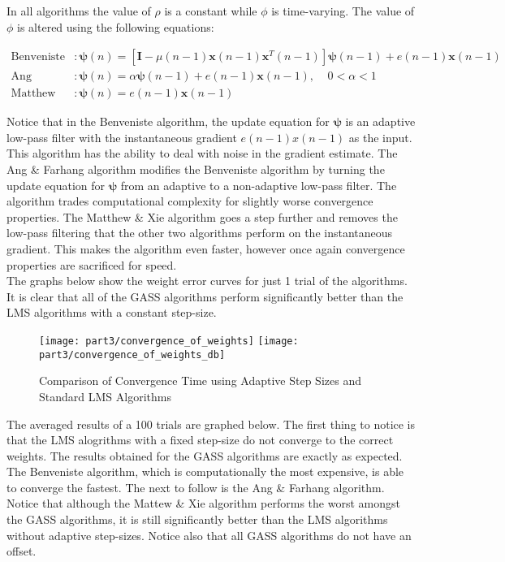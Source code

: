 \noindent{}In all algorithms the value of $\rho$ is a constant while $\phi$ is time-varying. The value of $\phi$ is altered using the following equations:

\begin{align*}
\text{Benveniste}&: \bm{\psi}(n)=[\textbf{I}-\mu(n-1)\textbf{x}(n-1)\textbf{x}^T(n-1)]\bm{\psi}(n-1) + e(n-1)\bm{x}(n-1) \\
\text{Ang \& Farhang}&: \bm{\psi}(n)=\alpha\bm{\psi}(n-1) + e(n-1)\bm{x}(n-1), \ \ \ \ \ 0 < \alpha < 1 \\
\text{Matthew \& Xie}&: \bm{\psi}(n)=e(n-1)\bm{x}(n-1)
\end{align*}

\noindent{}Notice that in the Benveniste algorithm, the update equation for $\bm{\psi}$ is an adaptive low-pass filter with the instantaneous gradient $e(n-1)x(n-1)$ as the input. This algorithm has the ability to deal with noise in the gradient estimate. The Ang \& Farhang algorithm modifies the Benveniste algorithm by turning the update equation for $\bm{\psi}$ from an adaptive to a non-adaptive low-pass filter. The algorithm trades computational complexity for slightly worse convergence properties. The Matthew \& Xie algorithm goes a step further and removes the low-pass filtering that the other two algorithms perform on the instantaneous gradient. This makes the algorithm even faster, however once again convergence properties are sacrificed for speed.\\

\noindent{}The graphs below show the weight error curves for just 1 trial of the algorithms. It is clear that all of the GASS algorithms perform significantly better than the LMS algorithms with a constant step-size.

\begin{figure}[H]
\centering{}
\texttt{[image: part3/convergence\_of\_weights]}
\texttt{[image: part3/convergence\_of\_weights\_db]}
\caption{Comparison of Convergence Time using Adaptive Step Sizes and Standard LMS Algorithms}
\end{figure}

\noindent{}The averaged results of a 100 trials are graphed below. The first thing to notice is that the LMS alogrithms with a fixed step-size do not converge to the correct weights. The results obtained for the GASS algorithms are exactly as expected. The Benveniste algorithm, which is computationally the most expensive, is able to converge the fastest. The next to follow is the Ang \& Farhang algorithm. Notice that although the Mattew \& Xie algorithm performs the worst amongst the GASS algorithms, it is still significantly better than the LMS algorithms without adaptive step-sizes. Notice also that all GASS algorithms do not have an offset.


